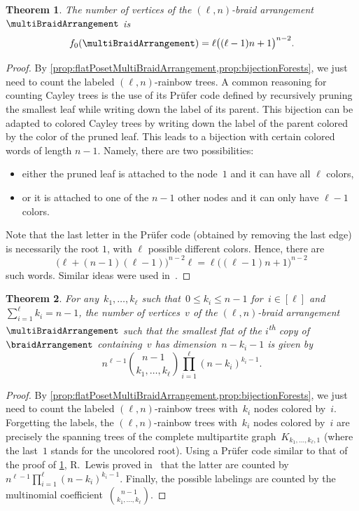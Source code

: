 \documentclass{amsart}
\newtheorem{theorem}{Theorem}[section]
\theoremstyle{definition}
\newcommand{\ordinal}{\textsuperscript{th}} %
\begin{document}
\begin{theorem}
\label{thm:verticesMultiBraidArrangement}
The number of vertices of the $(\ell,n)$-braid arrangement~$\multiBraidArrangement$ is
\[
f_0(\multiBraidArrangement) = \ell \big( (\ell-1) n + 1 \big)^{n-2}.
\]
\end{theorem}

\begin{proof}
By \cref{prop:flatPosetMultiBraidArrangement,prop:bijectionForests}, we just need to count the labeled $(\ell,n)$-rainbow trees.
A common reasoning for counting Cayley trees is the use of its Prüfer code defined by recursively pruning the smallest leaf while writing down the label of its parent.
This bijection can be adapted to colored Cayley trees by writing down the label of the parent colored by the color of the pruned leaf.
This leads to a bijection with certain colored words of length $n-1$.
Namely, there are two possibilities:
\begin{itemize}
\item either the pruned leaf is attached to the node~$1$ and it can have all $\ell$ colors,
\item or it is attached to one of the $n-1$ other nodes and it can only have $\ell-1$ colors.
\end{itemize}
Note that the last letter in the Prüfer code (obtained by removing the last edge) is necessarily the root $1$, with $\ell$ possible different colors.
Hence, there are 
\[
\big( \ell+(n-1)(\ell-1) \big)^{n-2} \ell = \ell \big( (\ell-1) n + 1 \big)^{n-2}
\]
such words.
Similar ideas were used in~\cite{Lewis}.
\end{proof}

\begin{theorem}
\label{thm:verticesRefinedMultiBraidArrangement}
For any~$k_1, \dots, k_\ell$ such that~$0 \le k_i \le n-1$ for~$i \in [\ell]$ and~${\sum_{i=1}^\ell k_i = n-1}$, the number of vertices~$v$ of the $(\ell,n)$-braid arrangement~$\multiBraidArrangement$ such that the smallest flat of the $i$\ordinal{} copy of~$\braidArrangement$ containing~$v$ has dimension~$n-k_i-1$ is given by
\[
n^{\ell-1} \binom{n-1}{k_1, \dots, k_\ell} \prod_{i=1}^\ell (n-k_i)^{k_i-1}.
\]
\end{theorem}

\begin{proof}
By \cref{prop:flatPosetMultiBraidArrangement,prop:bijectionForests}, we just need to count the labeled $(\ell,n)$-rainbow trees with~$k_i$ nodes colored by~$i$.
Forgetting the labels, the $(\ell,n)$-rainbow trees with~$k_i$ nodes colored by~$i$ are precisely the spanning trees of the complete multipartite graph~$K_{k_1, \dots, k_\ell, 1}$ (where the last~$1$ stands for the uncolored root).
Using a Pr\"ufer code similar to that of the proof of \cref{thm:verticesMultiBraidArrangement}, R.~Lewis proved in~\cite{Lewis} that the latter are counted by~${n^{\ell-1} \prod_{i=1}^\ell (n-k_i)^{k_i-1}}$.
Finally, the possible labelings are counted by the multinomial coefficient~$\binom{n-1}{k_1, \dots, k_\ell}$.
\end{proof}
\end{document}
